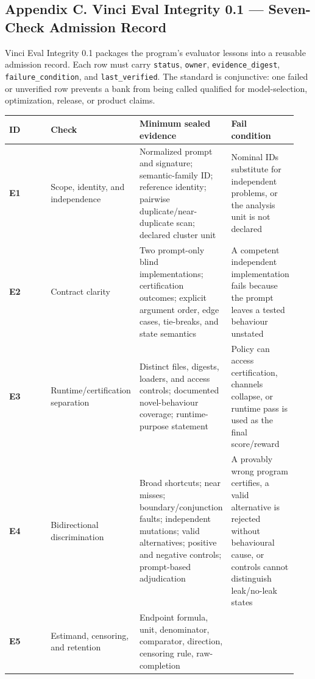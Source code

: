 \documentclass[
]{article}
\newcounter{none} %
\begin{document}
\subsection{Appendix C. Vinci Eval Integrity 0.1 --- Seven-Check
Admission
Record}\label{appendix-c-vinci-eval-integrity-01--seven-check-admission-record}

Vinci Eval Integrity 0.1 packages the program's evaluator lessons into a
reusable admission record. Each row must carry \texttt{status},
\texttt{owner}, \texttt{evidence\_digest}, \texttt{failure\_condition},
and \texttt{last\_verified}. The standard is conjunctive: one failed or
unverified row prevents a bank from being called qualified for
model-selection, optimization, release, or product claims.

{\def\LTcaptype{none} %
\begin{longtable}[]{@{}p{0.28\linewidth}p{0.25\linewidth}p{0.21\linewidth}p{0.20\linewidth}@{}}
\toprule\noalign{}
ID & Check & Minimum sealed evidence & Fail condition \\
\midrule\noalign{}
\endhead
\bottomrule\noalign{}
\endlastfoot
\textbf{E1} & Scope, identity, and independence & Normalized prompt and
signature; semantic-family ID; reference identity; pairwise
duplicate/near-duplicate scan; declared cluster unit & Nominal IDs
substitute for independent problems, or the analysis unit is not
declared \\
\textbf{E2} & Contract clarity & Two prompt-only blind implementations;
certification outcomes; explicit argument order, edge cases, tie-breaks,
and state semantics & A competent independent implementation fails
because the prompt leaves a tested behaviour unstated \\
\textbf{E3} & Runtime/certification separation & Distinct files,
digests, loaders, and access controls; documented novel-behaviour
coverage; runtime-purpose statement & Policy can access certification,
channels collapse, or runtime pass is used as the final score/reward \\
\textbf{E4} & Bidirectional discrimination & Broad shortcuts; near
misses; boundary/conjunction faults; independent mutations; valid
alternatives; positive and negative controls; prompt-based adjudication
& A provably wrong program certifies, a valid alternative is rejected
without behavioural cause, or controls cannot distinguish leak/no-leak
states \\
\textbf{E5} & Estimand, censoring, and retention & Endpoint formula,
unit, denominator, comparator, direction, censoring rule, raw-completion

\end{longtable}}
\end{document}
